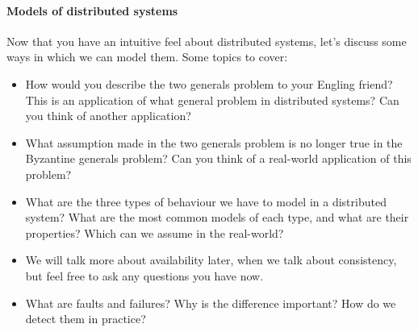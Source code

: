 \documentclass[12pt,a4paper,oneside,openright]{report}
\newcommand{\question}[2]{\paragraph{#1} #2}
\begin{document}
\question{Models of distributed systems}{Now that you have an
  intuitive feel about distributed systems, let's discuss some ways in
  which we can model them. Some topics to cover:
  \begin{itemize}
  \item How would you describe the two generals problem to your
    Engling friend? This is an application of what general problem in
    distributed systems? Can you think of another application?
  \item What assumption made in the two generals problem is no longer
    true in the Byzantine generals problem? Can you think of a
    real-world application of this problem?
  \item What are the three types of behaviour we have to model in a
    distributed system? What are the most common models of each type,
    and what are their properties? Which can we assume in the
    real-world?
  \item We will talk more about availability later, when we talk about
    consistency, but feel free to ask any questions you have now.
  \item What are faults and failures? Why is the difference important?
    How do we detect them in practice?
  \end{itemize}
}
\end{document}
